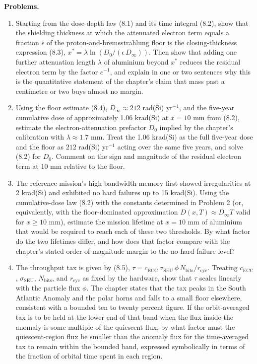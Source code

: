 \documentclass[
  11pt,
  openany,
  oneside]{book}
\begin{document}
\textbf{Problems.}

\begin{enumerate}
\def\labelenumi{\arabic{enumi}.}
\item
  Starting from the dose-depth law (8.1) and its time integral (8.2),
  show that the shielding thickness at which the attenuated electron
  term equals a fraction \(\epsilon\) of the proton-and-bremsstrahlung
  floor is the closing-thickness expression (8.3),
  \(x^{*} = \lambda \ln\!\left( D_0 / (\epsilon\, D_\infty) \right)\).
  Then show that adding one further attenuation length \(\lambda\) of
  aluminium beyond \(x^{*}\) reduces the residual electron term by the
  factor \(e^{-1}\), and explain in one or two sentences why this is the
  quantitative statement of the chapter's claim that mass past a
  centimetre or two buys almost no margin.
\item
  Using the floor estimate (8.4), \(D_\infty \approx 212\) rad(Si)
  yr\(^{-1}\), and the five-year cumulative dose of approximately 1.06
  krad(Si) at \(x = 10\) mm from (8.2), estimate the
  electron-attenuation prefactor \(D_0\) implied by the chapter's
  calibration with \(\lambda \approx 1.7\) mm. Treat the 1.06 krad(Si)
  as the full five-year dose and the floor as \(212\) rad(Si)
  yr\(^{-1}\) acting over the same five years, and solve (8.2) for
  \(D_0\). Comment on the sign and magnitude of the residual electron
  term at 10 mm relative to the floor.
\item
  The reference mission's high-bandwidth memory first showed
  irregularities at 2 krad(Si) and exhibited no hard failures up to 15
  krad(Si). Using the cumulative-dose law (8.2) with the constants
  determined in Problem 2 (or, equivalently, with the floor-dominated
  approximation \(D(x,T) \approx D_\infty T\) valid for \(x \ge 10\)
  mm), estimate the mission lifetime at \(x = 10\) mm of aluminium that
  would be required to reach each of these two thresholds. By what
  factor do the two lifetimes differ, and how does that factor compare
  with the chapter's stated order-of-magnitude margin to the
  no-hard-failure level?
\item
  The throughput tax is given by (8.5),
  \(\tau = c_{\mathrm{ECC}}\, \sigma_{\mathrm{SEU}}\, \phi\, N_{\mathrm{bits}} / r_{\mathrm{cyc}}\).
  Treating \(c_{\mathrm{ECC}}\), \(\sigma_{\mathrm{SEU}}\),
  \(N_{\mathrm{bits}}\), and \(r_{\mathrm{cyc}}\) as fixed by the
  hardware, show that \(\tau\) scales linearly with the particle flux
  \(\phi\). The chapter states that the tax peaks in the South Atlantic
  Anomaly and the polar horns and falls to a small floor elsewhere,
  consistent with a bounded ten to twenty percent figure. If the
  orbit-averaged tax is to be held at the lower end of that band when
  the flux inside the anomaly is some multiple of the quiescent flux, by
  what factor must the quiescent-region flux be smaller than the anomaly
  flux for the time-averaged tax to remain within the bounded band,
  expressed symbolically in terms of the fraction of orbital time spent
  in each region.
\end{enumerate}
\end{document}
